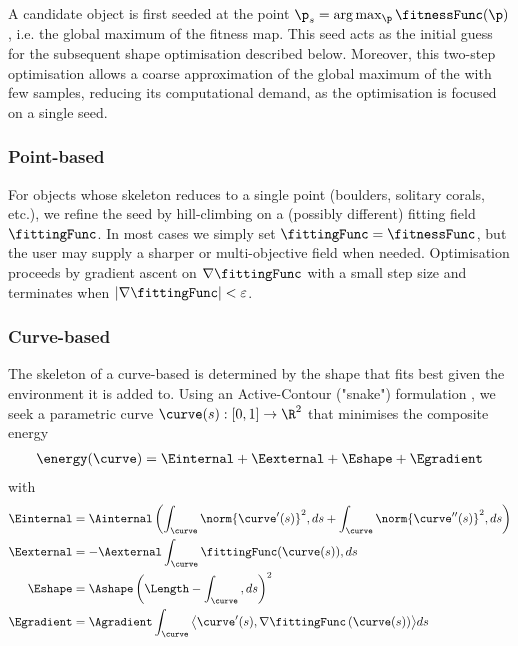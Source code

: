 \subsection{}

A candidate object is first seeded at the point $\p_s = \arg \max_\p \fitnessFunc(\p)$, i.e. the global maximum of the fitness map. This seed acts as the initial guess for the subsequent shape optimisation described below. Moreover, this two-step optimisation allows a coarse approximation of the global maximum of the  with few samples, reducing its computational demand, as the  optimisation is focused on a single seed.

\subsubsection{Point-based }

For objects whose skeleton reduces to a single point (boulders, solitary corals, etc.), we refine the seed by hill-climbing on a (possibly different) fitting field $\fittingFunc$. In most cases we simply set $\fittingFunc = \fitnessFunc$, but the user may supply a sharper or multi-objective field when needed. Optimisation proceeds by gradient ascent on $\nabla\fittingFunc$ with a small step size and terminates when $|\nabla \fittingFunc|<\varepsilon$.

\subsubsection{Curve-based }

The skeleton of a curve-based  is determined by the shape that fits best given the environment it is added to.
Using an Active-Contour ("snake") formulation \cite{Kass1988}, we seek a parametric curve $\curve(s) : [0,1] \to \R^{2}$ that minimises the composite energy
\begin{align}
\energy(\curve) = \Einternal + \Eexternal + \Eshape + \Egradient
\end{align}
with
\begin{align}
    \label{eq:env-obj-snake-energy-equation-internal}
    \Einternal &= \Ainternal \left( \int_{\curve}{ \norm{\curve'(s)}^2 , ds} + \int_{\curve}{ \norm{\curve''(s)}^2 , ds} \right) \\
    \label{eq:env-obj-snake-energy-equation-external}
    \Eexternal &= -\Aexternal \int_{\curve}{ \fittingFunc(\curve(s)) , ds } \\
    \label{eq:env-obj-snake-energy-equation-shape}
    \Eshape &= \Ashape \left( \Length - \int_{\curve}{ , ds } \right)^2 \\
    \label{eq:env-obj-snake-energy-equation-gradient}
    \Egradient &= \Agradient \int_{\curve}{\bigl\langle \curve'(s),\nabla\fittingFunc\left(\curve(s)\right)\bigr\rangle ds}
\end{align}

